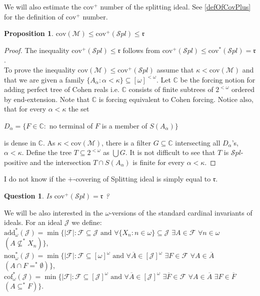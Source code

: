 \documentclass[a4paper]{amsart}
\newtheorem{proposition}[theorem]{Proposition}
\newtheorem{question}[theorem]{Question}
\newcommand{\rrr}{\mathfrak{r}}
\newcommand{\Meager}{\mathcal{M}}
\newcommand{\cantor}{2^{<\omega}}
\newcommand{\add}{\mathrm{add}}
\newcommand{\cof}{\mathrm{cof}}
\newcommand{\cov}{\mathrm{cov}}
\newcommand{\non}{\mathrm{non}}
\newcommand{\J}{\mathcal{J}}
\newcommand{\SPL}{\mathcal{S}pl}
\begin{document}
We will also estimate the $\cov^{+}$ number of the splitting ideal. See \ref{defOfCovPlus} for the definition of $\cov^{+}$ number.
    \begin{proposition}
    $\cov(\Meager)\leq\cov^{+}(\SPL)\leq\rrr$
    \end{proposition}
    \begin{proof}
        The inequality $\cov^{+}(\SPL)\leq\rrr$ follows from $\cov^{+}(\SPL)\leq\cov^{*}(\SPL)=\rrr$.\\
        To prove the inequality $\cov(\Meager)\leq\cov^{+}(\SPL)$ assume that $\kappa<\cov(\Meager)$ and that we are given a family $\{A_{\alpha}:\alpha<\kappa\}\subseteq[\omega]^{<\omega}$. Let $\mathbb{C}$ be the forcing notion for adding perfect tree of Cohen reals i.e. $\mathbb{C}$ consists of finite subtrees of $\cantor$ ordered by end-extension. Note that $\mathbb{C}$ is forcing equivalent to Cohen forcing. Notice also, that for every $\alpha<\kappa$ the set
        \begin{center}
            $D_{\alpha}=\{F\in\mathbb{C}:$ no terminal of $F$ is a member of $S(A_{\alpha})\}$
        \end{center}
        is dense in $\mathbb{C}$. As $\kappa<\cov(\Meager)$, there is a filter $G\subseteq\mathbb{C}$ intersecting all $D_{\alpha}$'s, $\alpha<\kappa$. Define the tree $T\subseteq\cantor$ as $\bigcup G$. It is not difficult to see that $T$ is $\SPL$-positive and the intersection $T\cap S(A_{\alpha})$ is finite for every $\alpha<\kappa$.
    \end{proof}
    I do not know if the $+$-covering of Splitting ideal is simply equal to $\rrr$.
    \begin{question}
        Is $\cov^{+}(\SPL)=\rrr$ ? 
    \end{question}
    We will be also interested in the $\omega$-versions of the standard cardinal invariants of ideals. For an ideal $\J$ we define:\\
    $\add_{\omega}^*(\J) = \min\{ |\mathcal{F}| : \mathcal{F} \subseteq \J \text{ and } \forall \{X_{n}:n\in\omega\} \subseteq \J$ $\exists A \in \mathcal{F}$ $\forall n\in\omega$ $(A \nsubseteq^* X_{n}) \}$,\\
    $\non_{\omega}^*(\J) = \min\{ |\mathcal{F}| : \mathcal{F} \subseteq [\omega]^{\omega} \text{ and } \forall \overline{A}\in[\J]^{\omega}$ $ \exists F\in\mathcal{F}$ $\forall A\in\overline{A}$ $(A\cap F=^*\emptyset) \}$,\\
    $\cof_{\omega}^*(\J) = \min\{ |\mathcal{F}| : \mathcal{F} \subseteq [\J]^{\omega} \text{ and } \forall \overline{A} \in [\J]^{\omega}$ $ \exists \overline{F}\in\mathcal{F}$ $\forall A\in\overline{A}$ $\exists F\in\overline{F}$ $(A\subseteq^{*}F)\}$.\\
    
\end{document}
